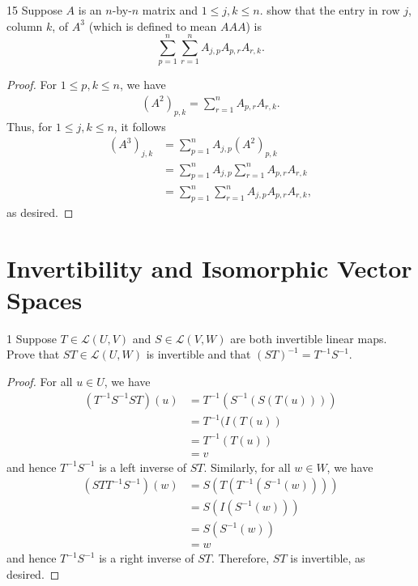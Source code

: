 \documentclass[11pt]{extarticle}
\newenvironment{problem}[1]{\begin{prob*}{#1}{}}{\end{prob*}}
\newcommand{\Hom}{\mathcal{L}}
\begin{document}
\begin{problem}{15}
Suppose $A$ is an $n$-by-$n$ matrix and $1\leq j,k\leq n$.  show that the entry in row $j$, column $k$, of $A^3$ (which is defined to mean $AAA$) is
\begin{equation*}
\sum_{p=1}^n\sum_{r = 1}^nA_{j,p}A_{p,r}A_{r,k}.
\end{equation*}
\end{problem}
\begin{proof}
For $1\leq p,k\leq n$, we have
\begin{align*}
(A^2)_{p,k} = \sum_{r=1}^nA_{p,r}A_{r,k}.
\end{align*}
Thus, for $1\leq j,k\leq n$, it follows
\begin{align*}
(A^3)_{j,k} &= \sum_{p = 1}^n A_{j,p}(A^2)_{p,k}\\
&= \sum_{p = 1}^nA_{j,p}\sum_{r = 1}^n A_{p, r}A_{r, k}\\
&= \sum_{p = 1}^n\sum_{r = 1}^nA_{j,p}A_{p,r}A_{r, k},
\end{align*}
as desired.
\end{proof}


\section{Invertibility and Isomorphic Vector Spaces}

\begin{problem}{1}
Suppose $T\in\Hom(U,V)$ and $S\in\Hom(V,W)$ are both invertible linear maps.  Prove that $ST\in\Hom(U,W)$ is invertible and that $(ST)^{-1}=T^{-1}S^{-1}$.  
\end{problem}
\begin{proof}
For all $u \in U$, we have
\begin{align*}
(T^{-1}S^{-1}ST)(u) &= T^{-1}(S^{-1}(S(T(u))))\\
&= T^{-1}(I(T(u))\\
&= T^{-1}(T(u))\\
&= v
\end{align*}
and hence $T^{-1}S^{-1}$ is a left inverse of $ST$.  Similarly, for all $w \in W$, we have
\begin{align*}
(STT^{-1}S^{-1})(w) &= S(T(T^{-1}(S^{-1}(w))))\\
&= S(I(S^{-1}(w)))\\
&= S(S^{-1}(w))\\
&= w
\end{align*}
and hence $T^{-1}S^{-1}$ is a right inverse of $ST$.  Therefore, $ST$ is invertible, as desired.
\end{proof}
\end{document}
